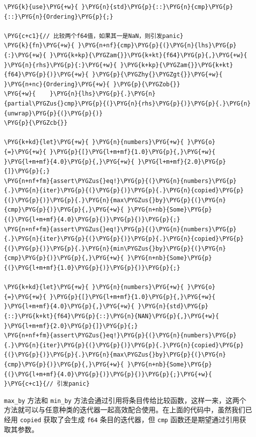 \begin{Verbatim}[commandchars=\\\{\},breaklines=true,breakanywhere=true,fontsize=\codefont,xleftmargin=17bp]
\PYG{k}{use}\PYG{+w}{ }\PYG{n}{std}\PYG{p}{::}\PYG{n}{cmp}\PYG{p}{::}\PYG{n}{Ordering}\PYG{p}{;}

\PYG{c+c1}{// 比较两个f64值，如果其一是NaN，则引发panic}
\PYG{k}{fn}\PYG{+w}{ }\PYG{n+nf}{cmp}\PYG{p}{(}\PYG{n}{lhs}\PYG{p}{:}\PYG{+w}{ }\PYG{k+kp}{\PYGZam{}}\PYG{k+kt}{f64}\PYG{p}{,}\PYG{+w}{ }\PYG{n}{rhs}\PYG{p}{:}\PYG{+w}{ }\PYG{k+kp}{\PYGZam{}}\PYG{k+kt}{f64}\PYG{p}{)}\PYG{+w}{ }\PYG{p}{\PYGZhy{}\PYGZgt{}}\PYG{+w}{ }\PYG{n+nc}{Ordering}\PYG{+w}{ }\PYG{p}{\PYGZob{}}
\PYG{+w}{    }\PYG{n}{lhs}\PYG{p}{.}\PYG{n}{partial\PYGZus{}cmp}\PYG{p}{(}\PYG{n}{rhs}\PYG{p}{)}\PYG{p}{.}\PYG{n}{unwrap}\PYG{p}{(}\PYG{p}{)}
\PYG{p}{\PYGZcb{}}

\PYG{k+kd}{let}\PYG{+w}{ }\PYG{n}{numbers}\PYG{+w}{ }\PYG{o}{=}\PYG{+w}{ }\PYG{p}{[}\PYG{l+m+mf}{1.0}\PYG{p}{,}\PYG{+w}{ }\PYG{l+m+mf}{4.0}\PYG{p}{,}\PYG{+w}{ }\PYG{l+m+mf}{2.0}\PYG{p}{]}\PYG{p}{;}
\PYG{n+nf+fm}{assert\PYGZus{}eq!}\PYG{p}{(}\PYG{n}{numbers}\PYG{p}{.}\PYG{n}{iter}\PYG{p}{(}\PYG{p}{)}\PYG{p}{.}\PYG{n}{copied}\PYG{p}{(}\PYG{p}{)}\PYG{p}{.}\PYG{n}{max\PYGZus{}by}\PYG{p}{(}\PYG{n}{cmp}\PYG{p}{)}\PYG{p}{,}\PYG{+w}{ }\PYG{n+nb}{Some}\PYG{p}{(}\PYG{l+m+mf}{4.0}\PYG{p}{)}\PYG{p}{)}\PYG{p}{;}
\PYG{n+nf+fm}{assert\PYGZus{}eq!}\PYG{p}{(}\PYG{n}{numbers}\PYG{p}{.}\PYG{n}{iter}\PYG{p}{(}\PYG{p}{)}\PYG{p}{.}\PYG{n}{copied}\PYG{p}{(}\PYG{p}{)}\PYG{p}{.}\PYG{n}{min\PYGZus{}by}\PYG{p}{(}\PYG{n}{cmp}\PYG{p}{)}\PYG{p}{,}\PYG{+w}{ }\PYG{n+nb}{Some}\PYG{p}{(}\PYG{l+m+mf}{1.0}\PYG{p}{)}\PYG{p}{)}\PYG{p}{;}

\PYG{k+kd}{let}\PYG{+w}{ }\PYG{n}{numbers}\PYG{+w}{ }\PYG{o}{=}\PYG{+w}{ }\PYG{p}{[}\PYG{l+m+mf}{1.0}\PYG{p}{,}\PYG{+w}{ }\PYG{l+m+mf}{4.0}\PYG{p}{,}\PYG{+w}{ }\PYG{n}{std}\PYG{p}{::}\PYG{k+kt}{f64}\PYG{p}{::}\PYG{n}{NAN}\PYG{p}{,}\PYG{+w}{ }\PYG{l+m+mf}{2.0}\PYG{p}{]}\PYG{p}{;}
\PYG{n+nf+fm}{assert\PYGZus{}eq!}\PYG{p}{(}\PYG{n}{numbers}\PYG{p}{.}\PYG{n}{iter}\PYG{p}{(}\PYG{p}{)}\PYG{p}{.}\PYG{n}{copied}\PYG{p}{(}\PYG{p}{)}\PYG{p}{.}\PYG{n}{max\PYGZus{}by}\PYG{p}{(}\PYG{n}{cmp}\PYG{p}{)}\PYG{p}{,}\PYG{+w}{ }\PYG{n+nb}{Some}\PYG{p}{(}\PYG{l+m+mf}{4.0}\PYG{p}{)}\PYG{p}{)}\PYG{p}{;}\PYG{+w}{ }\PYG{c+c1}{// 引发panic}
\end{Verbatim}

\texttt{max\_by} 方法和 \texttt{min\_by} 方法会通过引用将条目传给比较函数，这样一来，这两个方法就可以与任意种类的迭代器一起高效配合使用。在上面的代码中，虽然我们已经用 \texttt{copied} 获取了会生成 \texttt{f64} 条目的迭代器，但 \texttt{cmp} 函数还是期望通过引用获取其参数。

